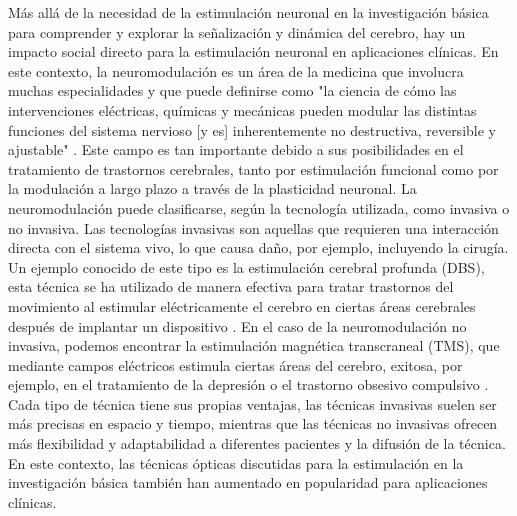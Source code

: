 Más allá de la necesidad de la estimulación neuronal en la investigación básica para comprender y explorar la señalización y dinámica del cerebro, hay un impacto social directo para la estimulación neuronal en aplicaciones clínicas. En este contexto, la neuromodulación es un área de la medicina que involucra muchas especialidades y que puede definirse como "la ciencia de cómo las intervenciones eléctricas, químicas y mecánicas pueden modular las distintas funciones del sistema nervioso [y es] inherentemente no destructiva, reversible y ajustable" \parencite{krames_neuromodulation_2009}. Este campo es tan importante debido a sus posibilidades en el tratamiento de trastornos cerebrales, tanto por estimulación funcional como por la modulación a largo plazo a través de la plasticidad neuronal. La neuromodulación puede clasificarse, según la tecnología utilizada, como invasiva o no invasiva. Las tecnologías invasivas son aquellas que requieren una interacción directa con el sistema vivo, lo que causa daño, por ejemplo, incluyendo la cirugía. Un ejemplo conocido de este tipo es la estimulación cerebral profunda (DBS), esta técnica se ha utilizado de manera efectiva para tratar trastornos del movimiento al estimular eléctricamente el cerebro en ciertas áreas cerebrales después de implantar un dispositivo \parencite{limousin_long-term_2019, hariz_deep_2022}. En el caso de la neuromodulación no invasiva, podemos encontrar la estimulación magnética transcraneal (TMS), que mediante campos eléctricos estimula ciertas áreas del cerebro, exitosa, por ejemplo, en el tratamiento de la depresión o el trastorno obsesivo compulsivo \parencite{valero-cabre_transcranial_2017, clarke_patients_2018}. Cada tipo de técnica tiene sus propias ventajas, las técnicas invasivas suelen ser más precisas en espacio y tiempo, mientras que las técnicas no invasivas ofrecen más flexibilidad y adaptabilidad a diferentes pacientes y la difusión de la técnica. En este contexto, las técnicas ópticas discutidas para la estimulación en la investigación básica también han aumentado en popularidad para aplicaciones clínicas.
